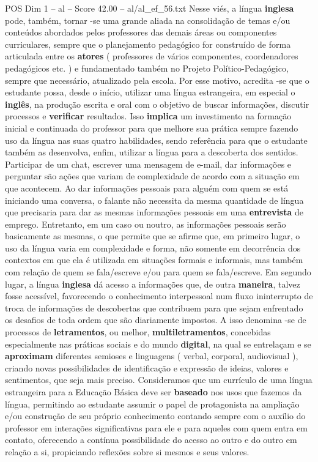 \begin{textsample}{POS Dim 1 – al – Score 42.00 – al/al\_ef\_56.txt}
Nesse viés, a língua \textbf{inglesa} pode, também, tornar -se uma grande aliada na consolidação de temas e/ou conteúdos abordados pelos professores das demais áreas ou componentes curriculares, sempre que o planejamento pedagógico for construído de forma articulada entre os \textbf{atores} ( professores de vários componentes, coordenadores pedagógicos etc. ) e fundamentado também no Projeto Político-Pedagógico, sempre que necessário, atualizado pela escola.
Por esse motivo, acredita -se que o estudante possa, desde o início, utilizar uma língua estrangeira, em especial o \textbf{inglês}, na produção escrita e oral com o objetivo de buscar informações, discutir processos e \textbf{verificar} resultados.
Isso \textbf{implica} um investimento na formação inicial e continuada do professor para que melhore sua prática sempre fazendo uso da língua nas suas quatro habilidades, sendo referência para que o estudante também as desenvolva, enfim, utilizar a língua para a descoberta dos sentidos.
Participar de um chat, escrever uma mensagem de e-mail, dar informações e perguntar são ações que variam de complexidade de acordo com a situação em que acontecem.
Ao dar informações pessoais para alguém com quem se está iniciando uma conversa, o falante não necessita da mesma quantidade de língua que precisaria para dar as mesmas informações pessoais em uma \textbf{entrevista} de emprego.
Entretanto, em um caso ou noutro, as informações pessoais serão basicamente as mesmas, o que permite que se afirme que, em primeiro lugar, o uso da língua varia em complexidade e forma, não somente em decorrência dos contextos em que ela é utilizada em situações formais e informais, mas também com relação de quem se fala/escreve e/ou para quem se fala/escreve.
Em segundo lugar, a língua \textbf{inglesa} dá acesso a informações que, de outra \textbf{maneira}, talvez fosse acessível, favorecendo o conhecimento interpessoal num fluxo ininterrupto de troca de informações de descobertas que contribuem para que sejam enfrentado os desafios de toda ordem que são diariamente impostos.
A isso denomina -se de processos de \textbf{letramentos}, ou melhor, \textbf{multiletramentos}, concebidas especialmente nas práticas sociais e do mundo \textbf{digital}, na qual se entrelaçam e se \textbf{aproximam} diferentes semioses e linguagens ( verbal, corporal, audiovisual ), criando novas possibilidades de identificação e expressão de ideias, valores e sentimentos, que seja mais preciso.
Consideramos que um currículo de uma língua estrangeira para a Educação Básica deve ser \textbf{baseado} nos usos que fazemos da língua, permitindo ao estudante assumir o papel de protagonista na ampliação e/ou construção de seu próprio conhecimento contando sempre com o auxílio do professor em interações significativas para ele e para aqueles com quem entra em contato, oferecendo a contínua possibilidade do acesso ao outro e do outro em relação a si, propiciando reflexões sobre si mesmos e seus valores.

\end{textsample}
